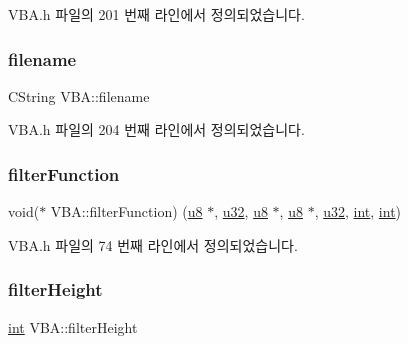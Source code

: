 V\+B\+A.\+h 파일의 201 번째 라인에서 정의되었습니다.

\mbox{\label{class_v_b_a_a66eee6b61ec8bee20f21164cb0c37d2d}} 
\subsubsection{\texorpdfstring{filename}{filename}}
{\footnotesize\ttfamily C\+String V\+B\+A\+::filename}



V\+B\+A.\+h 파일의 204 번째 라인에서 정의되었습니다.

\mbox{\label{class_v_b_a_a8267ca41247e8d752776b57a3f8af011}} 
\subsubsection{\texorpdfstring{filter\+Function}{filterFunction}}
{\footnotesize\ttfamily void($\ast$ V\+B\+A\+::filter\+Function) (\mbox{\hyperlink{_system_8h_aed742c436da53c1080638ce6ef7d13de}{u8}} $\ast$, \mbox{\hyperlink{_system_8h_a10e94b422ef0c20dcdec20d31a1f5049}{u32}}, \mbox{\hyperlink{_system_8h_aed742c436da53c1080638ce6ef7d13de}{u8}} $\ast$, \mbox{\hyperlink{_system_8h_aed742c436da53c1080638ce6ef7d13de}{u8}} $\ast$, \mbox{\hyperlink{_system_8h_a10e94b422ef0c20dcdec20d31a1f5049}{u32}}, \mbox{\hyperlink{_util_8cpp_a0ef32aa8672df19503a49fab2d0c8071}{int}}, \mbox{\hyperlink{_util_8cpp_a0ef32aa8672df19503a49fab2d0c8071}{int}})}



V\+B\+A.\+h 파일의 74 번째 라인에서 정의되었습니다.

\mbox{\label{class_v_b_a_a1c5e3ef2e69bfe2a6a877606fbb4de9c}} 
\subsubsection{\texorpdfstring{filter\+Height}{filterHeight}}
{\footnotesize\ttfamily \mbox{\hyperlink{_util_8cpp_a0ef32aa8672df19503a49fab2d0c8071}{int}} V\+B\+A\+::filter\+Height}



